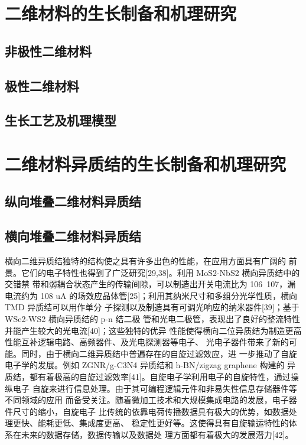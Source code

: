 \section{二维材料的生长制备和机理研究}
\subsection{非极性二维材料}
\subsection{极性二维材料}
\subsection{生长工艺及机理模型}

\section{二维材料异质结的生长制备和机理研究}
\subsection{纵向堆叠二维材料异质结}

\subsection{横向堆叠二维材料异质结}
横向二维异质结独特的结构使之具有许多出色的性能，在应用方面具有广阔的
前景。它们的电子特性也得到了广泛研究[29,38]。利用 MoS2-NbS2 横向异质结中的交错禁
带和弱耦合状态产生的传输间隙，可以制造出开关电流比为 106~107，漏电流约为 108
uA
的场效应晶体管[25]；利用其纳米尺寸和多组分光学性质，横向 TMD 异质结可以用作单分
子探测以及制造具有可调光响应的纳米器件[39]；基于 WSe2-WS2 横向异质结的 p-n 结二极
管和光电二极管，表现出了良好的整流特性并能产生较大的光电流[40]；这些独特的优异
性能使得横向二位异质结为制造更高性能互补逻辑电路、高频器件、及光电探测器等电子、
光电子器件带来了新的可能。同时，由于横向二维异质结中普遍存在的自旋过滤效应，进
一步推动了自旋电子学的发展。例如 ZGNR/g-C3N4 异质结和 h-BN/zigzag graphene 构建的
异质结，都有着极高的自旋过滤效率[41]。自旋电子学利用电子的自旋特性，通过操纵电子
自旋来进行信息处理。由于其可编程逻辑元件和非易失性信息存储器件等不同领域的应用
而备受关注。随着微加工技术和大规模集成电路的发展，电子器件尺寸的缩小，自旋电子
比传统的依靠电荷传播数据具有极大的优势，如数据处理更快、能耗更低、集成度更高、
稳定性更好等。这使得具有自旋输运特性的体系在未来的数据存储，数据传输以及数据处
理方面都有着极大的发展潜力[42]。


